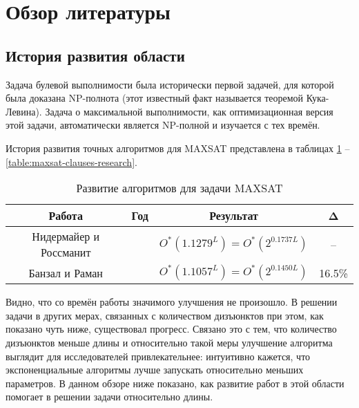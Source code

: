 
\section{Обзор литературы}
\label{sec:literature-review}

\subsection{История развития области}
\label{subsec:literature-review:history}

\firstpar{}Задача булевой выполнимости была исторически первой задачей, для которой была доказана NP-полнота (этот известный факт называется теоремой Кука-Левина). Задача о максимальной выполнимости, как оптимизационная версия этой задачи, автоматически является NP-полной и изучается с тех времён.

История развития точных алгоритмов для MAXSAT представлена в таблицах \ref{table:maxsat-length-research} -- \ref{table:maxsat-clauses-research}.

\begin{table}[ht]
 \caption{Развитие алгоритмов для задачи MAXSAT}
 \centering
 \begin{tabular}{|c|c|c|c|}
  \hline
  \textbf{Работа} & \textbf{Год} & \textbf{Результат} & \textbf{Δ} \\
  \hline
  Нидермайер и Россманит \cite{niedermeier1999new} & \citeyear{niedermeier1999new} & $O^*(1.1279^L) = O^*(2^{0.1737L})$ & -- \\
  Банзал и Раман \cite{bansal99} & \citeyear{bansal99} & $O^*(1.1057^L) = O^*(2^{0.1450L})$ & 16.5\% \\
  \hline
 \end{tabular}
 \label{table:maxsat-length-research}
\end{table}

Видно, что со времён работы \cite{bansal99} значимого улучшения не произошло. В решении задачи в других мерах, связанных с количеством дизъюнктов при этом, как показано чуть ниже, существовал прогресс. Связано это с тем, что количество дизъюнктов меньше длины и относительно такой меры улучшение алгоритма выглядит для исследователей привлекательнее: интуитивно кажется, что экспоненциальные алгоритмы лучше запускать относительно меньших параметров. В данном обзоре ниже показано, как развитие работ в этой области помогает в решении задачи относительно длины.

